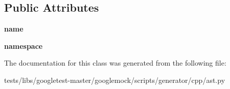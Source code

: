 \subsection*{Public Attributes}
\begin{DoxyCompactItemize}
\item 
\mbox{\label{classtests_1_1libs_1_1googletest-master_1_1googlemock_1_1scripts_1_1generator_1_1cpp_1_1ast_1_1__GenericDeclaration_a69ce68e1a9e5e6b6f22d39c0cf15f892}} 
{\bfseries name}
\item 
\mbox{\label{classtests_1_1libs_1_1googletest-master_1_1googlemock_1_1scripts_1_1generator_1_1cpp_1_1ast_1_1__GenericDeclaration_a22ea12de92346d9ef6511990bd2858f0}} 
{\bfseries namespace}
\end{DoxyCompactItemize}


The documentation for this class was generated from the following file\+:\begin{DoxyCompactItemize}
\item 
tests/libs/googletest-\/master/googlemock/scripts/generator/cpp/ast.\+py\end{DoxyCompactItemize}
